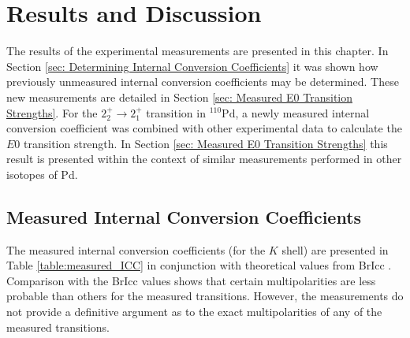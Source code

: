 
\chapter{Results and Discussion}
\label{ch:ResultsandDiscussion}

The results of the experimental measurements are presented in this chapter. In Section \ref{sec: Determining Internal Conversion Coefficients} it was shown how previously unmeasured internal conversion coefficients may be determined. These new measurements are detailed in Section \ref{sec: Measured E0 Transition Strengths}. For the $2^+_2 \rightarrow 2^+_1$ transition in $^{110}\mathrm{Pd}$, a newly measured internal conversion coefficient was combined with other experimental data to calculate the $E0$ transition strength. In Section \ref{sec: Measured E0 Transition Strengths} this result is presented within the context of similar measurements performed in other isotopes of Pd. 

\section{Measured Internal Conversion Coefficients}
\label{sec: Measured Internal Conversion Coefficients}

The measured internal conversion coefficients (for the $K$ shell) are presented in Table \ref{table:measured_ICC} in conjunction with theoretical values from BrIcc \cite{KIBEDI2008202}. Comparison with the BrIcc values shows that certain multipolarities are less probable than others for the measured transitions. However, the measurements do not provide a definitive argument as to the exact multipolarities of any of the measured transitions.

